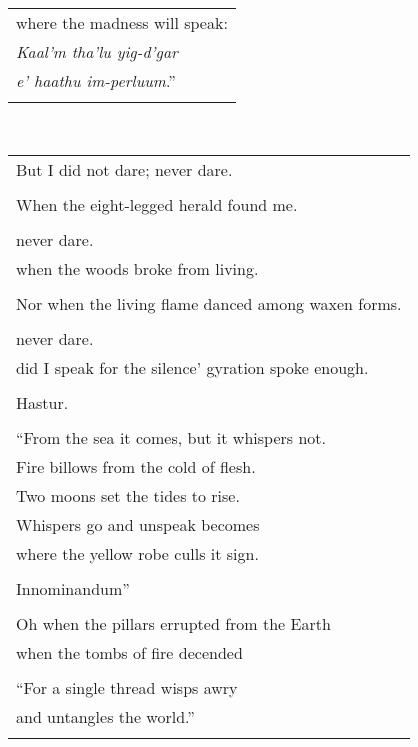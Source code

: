 \documentclass{article}
\begin{document}
\begin{center}
\begin{tabular}{l}
where the madness will speak: \\
\textit{Kaal'm tha'lu yig-d'gar} \\ %
\textit{e' haathu im-perluum}.'' \\ %
\\
\end{tabular} \\
\begin{tabular}{l}
But I did not dare; never dare. \\
\\
When the eight-legged herald found me. \\
\\
never dare. \\
when the woods broke from living. \\
\\
Nor when the living flame danced among waxen forms. \\
\\
never dare. \\
did I speak for the silence' gyration spoke enough. \\
\\
Hastur. \\ %
\\
``From the sea it comes, but it whispers not. \\
Fire billows from the cold of flesh. \\
Two moons set the tides to rise. \\
Whispers go and unspeak becomes \\
where the yellow robe culls it sign. \\
\\
Innominandum'' \\ %
\\
Oh when the pillars errupted from the Earth \\
when the tombs of fire decended \\
\\
``For a single thread wisps awry \\
and untangles the world.'' \\
\\
\end{tabular}
\end{center}
\end{document}
